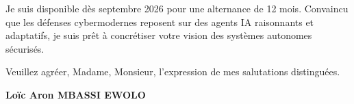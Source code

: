 \documentclass[a4paper,11pt]{article}
\begin{document}
\vspace{0.8em}
Je suis disponible dès septembre 2026 pour une alternance de 12 mois. Convaincu que les défenses cybermodernes reposent sur des agents IA raisonnants et adaptatifs, je suis prêt à concrétiser votre vision des systèmes autonomes sécurisés.

\vspace{1.5em}
\noindent Veuillez agréer, Madame, Monsieur, l'expression de mes salutations distinguées.

\vspace{2em}
\noindent \textbf{Loïc Aron MBASSI EWOLO}
\end{document}
